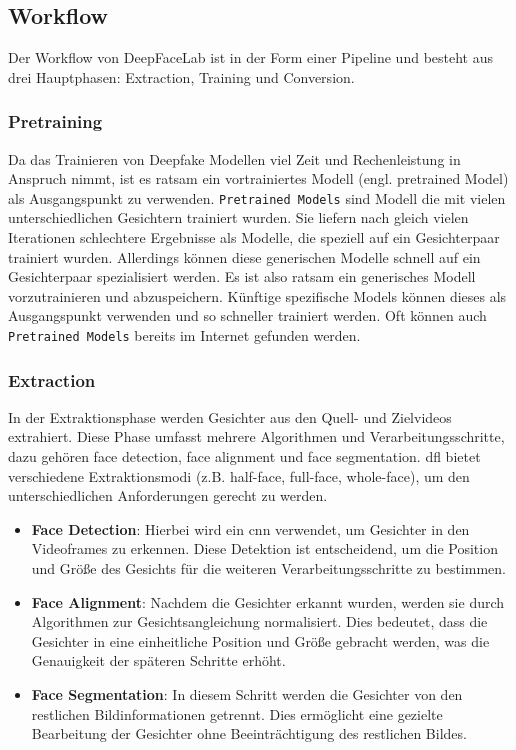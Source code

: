 \subsection{Workflow}\label{subsec:workflow}
Der Workflow von DeepFaceLab ist in der Form einer Pipeline und besteht aus drei Hauptphasen: Extraction, Training und Conversion.

\subsubsection{Pretraining}\label{subsubsec:pretraining}
Da das Trainieren von Deepfake Modellen viel Zeit und Rechenleistung in Anspruch nimmt, ist es ratsam ein vortrainiertes Modell (engl. pretrained Model) als Ausgangspunkt zu verwenden.
\texttt{Pretrained Models} sind Modell die mit vielen unterschiedlichen Gesichtern trainiert wurden.
Sie liefern nach gleich vielen Iterationen schlechtere Ergebnisse als Modelle, die speziell auf ein Gesichterpaar trainiert wurden.
Allerdings können diese generischen Modelle schnell auf ein Gesichterpaar spezialisiert werden.
Es ist also ratsam ein generisches Modell vorzutrainieren und abzuspeichern.
Künftige spezifische Models können dieses als Ausgangspunkt verwenden und so schneller trainiert werden.
Oft können auch \texttt{Pretrained Models} bereits im Internet gefunden werden.

\subsubsection{Extraction}
In der Extraktionsphase werden Gesichter aus den Quell- und Zielvideos extrahiert.
Diese Phase umfasst mehrere Algorithmen und Verarbeitungsschritte, dazu gehören face detection, face alignment und face segmentation.
\gls{dfl} bietet verschiedene Extraktionsmodi (z.B. half-face, full-face, whole-face), um den unterschiedlichen Anforderungen gerecht zu werden\cite{deepfacelabintegratedflexibleextensible, deepfacelab}.

\begin{itemize}
    \item \textbf{Face Detection}: Hierbei wird ein \gls{cnn} verwendet, um Gesichter in den Videoframes zu erkennen.
    Diese Detektion ist entscheidend, um die Position und Größe des Gesichts für die weiteren Verarbeitungsschritte zu bestimmen.
    \item \textbf{Face Alignment}: Nachdem die Gesichter erkannt wurden, werden sie durch Algorithmen zur Gesichtsangleichung normalisiert.
    Dies bedeutet, dass die Gesichter in eine einheitliche Position und Größe gebracht werden, was die Genauigkeit der späteren Schritte erhöht.
    \item \textbf{Face Segmentation}: In diesem Schritt werden die Gesichter von den restlichen Bildinformationen getrennt.
    Dies ermöglicht eine gezielte Bearbeitung der Gesichter ohne Beeinträchtigung des restlichen Bildes.
\end{itemize}


